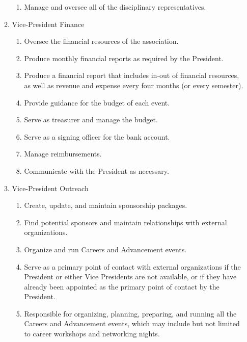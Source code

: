 \documentclass[12pt,a4paper]{article}
\begin{document}
\begin{enumerate}
\begin{enumerate}
\begin{enumerate}
\item Manage and oversee all of the disciplinary representatives.
\end{enumerate}

\item Vice-President Finance

\begin{enumerate}
\item Oversee the financial resources of the association.

\item Produce monthly financial reports as required by the President.

\item Produce a financial report that includes in-out of financial resources, as well as revenue and expense every four months (or every semester).

\item Provide guidance for the budget of each event.

\item Serve as treasurer and manage the budget.

\item Serve as a signing officer for the bank account.

\item Manage reimbursements.

\item Communicate with the President as necessary.
\end{enumerate}

\item Vice-President Outreach

\begin{enumerate}
\item Create, update, and maintain sponsorship packages.

\item Find potential sponsors and maintain relationships with external organizations.

\item Organize and run Careers and Advancement events.

\item Serve as a primary point of contact with external organizations if the President or either Vice Presidents are not available, or if they have already been appointed as the primary point of contact by the President.

\item Responsible for organizing, planning, preparing, and running all the Careers and Advancement events, which may include but not limited to career workshops and networking nights.


\end{enumerate}
\end{enumerate}
\end{enumerate}
\end{document}
